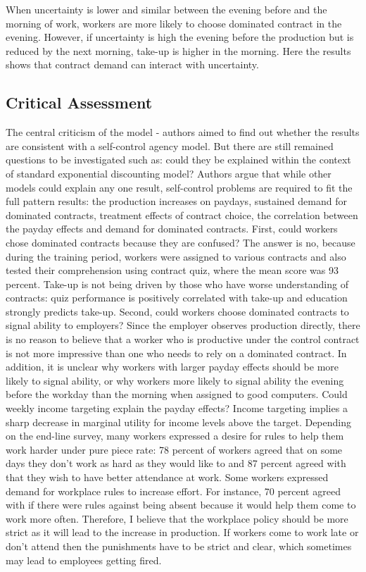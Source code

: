 \documentclass[a4paper,12pt]{article}
\begin{document}
When uncertainty is lower and similar between the evening before and the morning of work, workers are more likely to choose dominated contract in the evening. However, if uncertainty is high the evening before the production but is reduced by the next morning, take-up is higher in the morning. Here the results shows that contract demand can interact with uncertainty. 

\subsection{Critical Assessment}
The central criticism of the model - authors aimed to find out whether the results are consistent with a self-control agency model. But there are still remained questions to be investigated such as: could they be explained within the context of standard exponential discounting model? Authors argue that while other models could explain any one result, self-control problems are required to fit the full pattern results: the production increases on paydays, sustained demand for dominated contracts, treatment effects of contract choice, the correlation between the payday effects and demand for dominated contracts.  
First, could workers chose dominated contracts because they are confused? The answer is no, because during the training period, workers were assigned to various contracts and also tested their comprehension using contract quiz, where the mean score was 93 percent. Take-up is not being driven by those who have worse understanding of contracts: quiz performance is positively correlated with take-up and education strongly predicts take-up. Second, could workers choose dominated contracts to signal ability to employers? Since the employer observes production directly, there is no reason to believe that a worker who is productive under the control contract is not more impressive than one who needs to rely on a dominated contract. In addition, it is unclear why workers with larger payday effects should be more likely to signal ability, or why workers more likely to signal ability the evening before the workday than the morning when assigned to good computers. 
Could weekly income targeting explain the payday effects? Income targeting implies a sharp decrease in marginal utility for income levels above the target. 
Depending on the end-line survey, many workers expressed a desire for rules to help them work harder under pure piece rate: 78 percent of workers agreed that on some days they don't work as hard as they would like to and 87 percent agreed with that they wish to have better attendance at work. Some workers expressed demand for workplace rules to increase effort. For instance, 70 percent agreed with if there were rules against being absent because it would help them come to work more often. Therefore, I believe that the workplace policy should be more strict as it will lead to the increase in production.  If workers come to work late  or don't attend then the punishments have to be  strict and clear, which sometimes may lead to employees getting fired. 
\end{document}
